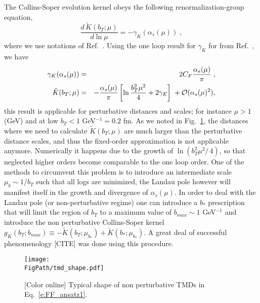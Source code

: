 \documentclass[final,3p,times,onecolumn,sort&compress,hidelinks]{elsarticle}
\newcommand\3[1]{\boldsymbol{#1}}
\newcommand*{\FigPath}{../Figs/}%
\begin{document}
  
The Collins-Soper evolution kernel obeys the following renormalization-group equation,
\begin{equation}
\frac{d\, \tilde K (b_T;\mu)}{d \ln \mu} = - \gamma_K (\alpha_s(\mu)) \; ,
\end{equation} 
where we use notations of Ref.~\cite{Collins:2011zzd}. Using the one loop result for $\gamma_K$ for from Ref.~\cite{Aybat:2011zv}, we have
\begin{eqnarray}
\gamma_K(\alpha_s(\mu)) &=& 2 C_F \frac{\alpha_s(\mu)}{\pi} \; ,\\
\tilde K (b_T;\mu) &=& -\frac{\alpha_s(\mu)}{\pi}  \left[\ln\frac{b_T^2 \mu^2}{4} + 2 \gamma_E
 \right] \; + {\cal O} (\alpha_s(\mu)^2),
 \label{e:CS_kernel}
\end{eqnarray}
this result is applicable for perturbative distances and scales; for instance $\mu > 1$ (GeV) and at low $b_T < 1$  GeV$^{-1} = 0.2$ fm. As we  noted in Fig.~\ref{Fig:tmd_shape},   the distances where we need to calculate $\tilde K (b_T;\mu)$ are much larger than the perturbative distance scales, and thus the fixed-order approximation is not applicable  anymore.  Numerically it happens due to the growth of $\ln\left(b_T^2 \mu^2/\, 4 \right) $, so that neglected higher orders become comparable to the  one loop order. One of the methods to circumvent this problem is to introduce an intermediate scale $\mu_b \sim 1/b_T$ such that all logs are minimized, the Landau pole however will manifest itself in the growth and divergence of $\alpha_s(\mu)$. In order to deal with the Landau pole (or non-perturbative regime) one can introduce a $b_*$ prescription~\cite{Collins:2011zzd} that will limit the region of $b_T$ to a maximum value of $b_{max} \sim 1$ GeV$^{-1}$ and introduce the non perturbative Collins-Soper kernel $g_K(b_T; b_{max}) \equiv - \tilde K(b_T; \mu_{b_*}) + \tilde K(b_*; \mu_{b_*})$. A great deal of successful phenomenology [CITE] was done using this procedure.



\begin{figure}[htb!]
\centering
\texttt{[image: \\FigPath/tmd\_shape.pdf]}
\caption{\label{Fig:tmd_shape}
[Color online] Typical shape of non perturbative TMDs in Eq.~\eqref{e:FF_ansatz1}.
}
\end{figure}
\end{document}
